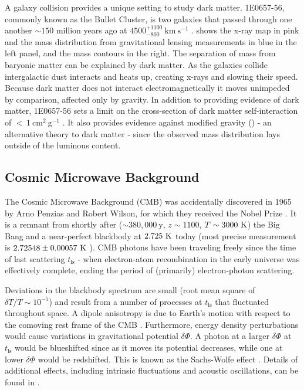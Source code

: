 A galaxy collision provides a unique setting to study dark matter.  1E0657-56, commonly known as the Bullet Cluster, is two galaxies that
passed through one another ${\sim}150$ million years ago at $4500_{-800}^{+1100}\ \mathrm{km\ s^{-1}}$
.   shows the x-ray map in pink and the mass
distribution from gravitational lensing measurements in blue in the left panel, and the mass contours in the right.  The separation of
mass from baryonic matter can be explained by dark matter.  As the galaxies collide intergalactic dust interacts
and heats up, creating x-rays and slowing their speed.  Because dark matter does not interact electromagnetically it moves
unimpeded by comparison, affected only by gravity.  In addition to providing evidence of dark matter, 1E0657-56 sets a limit on the
cross-section of dark matter self-interaction of ${<}\, 1\ \mathrm{cm^{2}\ g^{-1}}$ .  It also provides evidence
against modified gravity () - an alternative theory to dark matter - since the observed mass distribution
lays outside of the luminous content.




\subsection{Cosmic Microwave Background} \label{subsec:cmb}
The Cosmic Microwave Background (CMB) was accidentally discovered in 1965 by Arno Penzias and Robert Wilson, for which they received
the Nobel Prize .  It
is a remnant from shortly after (${\sim}380,000\ \mathrm{y}$, $z\sim1100$, $T\sim3000\ \mathrm{K}$) the Big Bang  and a near-perfect
blackbody at $2.725\ \mr{K}$ today (most precise measurement is $2.72548 \pm 0.00057\ \mathrm{K}$ ).  CMB photons
have been traveling freely since the time of last scattering $t_{\mathrm{ls}}$ - when electron-atom recombination in the early universe
was effectively complete, ending the period of (primarily) electron-photon scattering.

Deviations in the blackbody spectrum are small (root mean square of $\delta T/T \sim 10^{-5}$) and result from a number of
processes at $t_{\mathrm{ls}}$ that fluctuated throughout space.  A dipole anisotropy is due to
Earth's motion with respect to the comoving rest frame of the CMB .  Furthermore,
energy density perturbations would cause variations in gravitational potential $\delta \Phi$.  A
photon at a larger $\delta \Phi$ at $t_{\mathrm{ls}}$ would be blueshifted since as it moves its
potential decreases, while one at lower $\delta \Phi$ would be redshifted.  This is known as the
Sachs-Wolfe effect .  Details of additional effects, including intrinsic fluctuations and acoustic
oscillations, can be found in .

